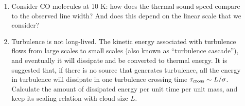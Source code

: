 \documentclass[12pt, letterpaper]{article}
\newcommand{\pc}{\mbox{$\rm pc$}}
\newcommand{\kms}{\mbox{$\rm km\,s^{-1}$}}
\begin{document}
\begin{enumerate}
\item Consider CO molecules at 10 K: how does the thermal sound speed compare to the observed line width? And does this depend on the linear scale that we consider?



\item Turbulence is not long-lived. The kinetic energy associated with turbulence flows from large scales to small scales (also known as ``turbulence cascade''), and eventually it will dissipate and be converted to thermal energy. It is suggested that, if there is no source that generates turbulence, all the energy in turbulence will dissipate in one turbulence crossing time $\tau_{\rm cross} \sim L/\sigma$. Calculate the amount of dissipated energy per unit time per unit mass, and keep its scaling relation with cloud size $L$.



\end{enumerate}
\end{document}
